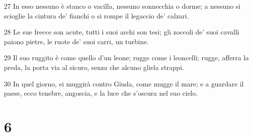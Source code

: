\par 27 In esso nessuno è stanco o vacilla, nessuno sonnecchia o dorme; a nessuno si scioglie la cintura de' fianchi o si rompe il legaccio de' calzari.
\par 28 Le sue frecce son acute, tutti i suoi archi son tesi; gli zoccoli de' suoi cavalli paiono pietre, le ruote de' suoi carri, un turbine.
\par 29 Il suo ruggito è come quello d'un leone; rugge come i leoncelli; rugge, afferra la preda, la porta via al sicuro, senza che alcuno gliela strappi.
\par 30 In quel giorno, ei muggirà contro Giuda, come mugge il mare; e a guardare il paese, ecco tenebre, angoscia, e la luce che s'oscura nel suo cielo.

\chapter{6}

